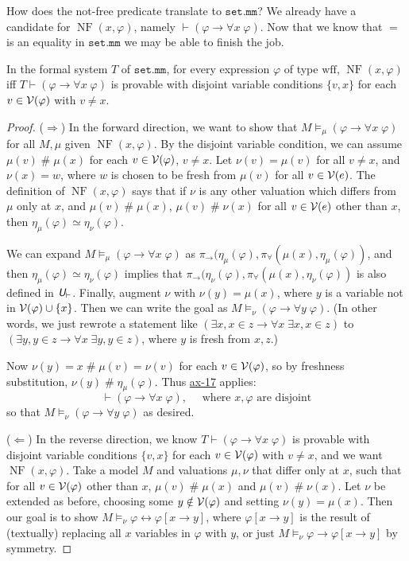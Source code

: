 \documentclass[runningheads,a4paper]{llncs}
\newcommand\thlink[1]{\href{http://us.metamath.org/mpegif/#1.html}{\textsf{#1}}}
\newcommand{\uv}{\textit{\textsf{U}}} %
\newcommand{\vph}{\varphi}
\newcommand{\fresh}{\mathbin{\#}}
\DeclareMathOperator{\NF}{NF}
\begin{document}
How does the not-free predicate translate to $\texttt{set.mm}$? We already have a candidate for $\NF(x,\vph)$, namely $\vdash(\vph\to\forall x\;\vph)$. Now that we know that $=$ is an equality in $\texttt{set.mm}$ we may be able to finish the job.

\begin{theorem}\label{thm:set-nf}
In the formal system $T$ of $\texttt{set.mm}$, for every expression $\vph$ of type $\mathrm{wff}$, $\NF(x,\vph)$ iff $T\vdash(\vph\to\forall x\;\vph)$ is provable with disjoint variable conditions $\{v,x\}$ for each $v\in{\cal V}(\vph)$ with $v\ne x$.
\end{theorem}
\begin{proof}
($\Rightarrow$) In the forward direction, we want to show that $M\models_\mu(\vph\to\forall x\;\vph)$ for all $M,\mu$ given $\NF(x,\vph)$. By the disjoint variable condition, we can assume $\mu(v)\fresh\mu(x)$ for each $v\in{\cal V}(\vph)$, $v\ne x$. Let $\nu(v)=\mu(v)$ for all $v\ne x$, and $\nu(x)=w$, where $w$ is chosen to be fresh from $\mu(v)$ for all $v\in{\cal V}(e)$. The definition of $\NF(x,\vph)$ says that if $\nu$ is any other valuation which differs from $\mu$ only at $x$, and $\mu(v)\fresh\mu(x)$, $\mu(v)\fresh\nu(x)$ for all $v\in{\cal V}(e)$ other than $x$, then $\eta_\mu(\vph)\simeq\eta_\nu(\vph)$.

We can expand $M\models_\mu(\vph\to\forall x\;\vph)$ as $\pi_\to(\eta_\mu(\vph),\pi_\forall(\mu(x),\eta_\mu(\vph))$, and then $\eta_\mu(\vph)\simeq\eta_\nu(\vph)$ implies that $\pi_\to(\eta_\nu(\vph),\pi_\forall(\mu(x),\eta_\nu(\vph))$ is also defined in $\uv_\vdash$. Finally, augment $\nu$ with $\nu(y)=\mu(x)$, where $y$ is a variable not in ${\cal V}(\vph)\cup\{x\}$. Then we can write the goal as $M\models_\nu(\vph\to\forall y\;\vph)$. (In other words, we just rewrote a statement like $(\exists x,x\in z\to\forall x\;\exists x,x\in z)$ to $(\exists y,y\in z\to\forall x\;\exists y,y\in z)$, where $y$ is fresh from $x,z$.)

Now $\nu(y)=x\fresh\mu(v)=\nu(v)$ for each $v\in{\cal V}(\vph)$, so by freshness substitution, $\nu(y)\fresh\eta_\mu(\vph)$. Thus \thlink{ax-17} applies:
$$\vdash(\vph\to\forall x\;\vph),\quad\mbox{ where }x,\vph\mbox{ are disjoint}$$
so that $M\models_\nu(\vph\to\forall y\;\vph)$ as desired.

($\Leftarrow$) In the reverse direction, we know $T\vdash(\vph\to\forall x\;\vph)$ is provable with disjoint variable conditions $\{v,x\}$ for each $v\in{\cal V}(\vph)$ with $v\ne x$, and we want $\NF(x,\vph)$.  Take a model $M$ and valuations $\mu,\nu$ that differ only at $x$, such that for all $v\in{\cal V}(\vph)$ other than $x$, $\mu(v)\fresh\mu(x)$ and $\mu(v)\fresh\nu(x)$.  Let $\nu$ be extended as before, choosing some $y\notin{\cal V}(\vph)$ and setting $\nu(y)=\mu(x)$. Then our goal is to show $M\models_\nu\vph\leftrightarrow\vph[x\to y]$, where $\vph[x\to y]$ is the result of (textually) replacing all $x$ variables in $\vph$ with $y$, or just $M\models_\nu\vph\to\vph[x\to y]$ by symmetry.


\end{proof}
\end{document}
